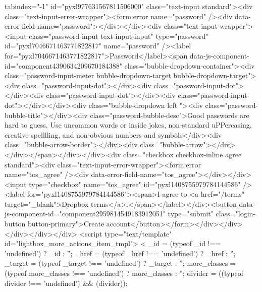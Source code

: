 {tabindex="-1" id="pyxl977631567811506000" class="text-input  standard"><div class="text-input-error-wrapper"><form:error name="password" /><div data-error-field-name="password"></div></div><div class="text-input-wrapper"><input class="password-input text-input-input" type="password" id="pyxl7046671463771822817" name="password" /><label for="pyxl7046671463771822817">Password</label><span data-js-component-id="component4390634209670184388" class="bubble-dropdown-container"><div class="password-input-meter bubble-dropdown-target bubble-dropdown-target"><div class="password-input-dot"></div><div class="password-input-dot"></div><div class="password-input-dot"></div><div class="password-input-dot"></div></div><div class="bubble-dropdown left "><div class="password-bubble-title"></div><div class="password-bubble-desc">Good passwords are hard to guess. Use uncommon words or inside jokes, non-standard uPPercasing, creative spelllling, and non-obvious numbers and symbols</div><div class="bubble-arrow-border"></div><div class="bubble-arrow"></div></div></span></div></div><div class="checkbox checkbox-inline agree standard"><div class="text-input-error-wrapper"><form:error name="tos_agree" /><div data-error-field-name="tos_agree"></div></div><input type="checkbox" name="tos_agree" id="pyxl1408755979784144586" /><label for="pyxl1408755979784144586"><span>I agree to <a href="/terms" target="_blank">Dropbox terms</a>.</span></label></div><button data-js-component-id="component2959814549183912051" type="submit" class="login-button button-primary">Create account</button></form></div></div></div></div></div>
<script type="text/template" id="lightbox_more_actions_item_tmpl">
<%
  _id = (typeof _id !== 'undefined') ? _id : '';
  _href = (typeof _href !== 'undefined') ? _href : '';
  _target = (typeof _target !== 'undefined') ? _target : '';
  more_classes = (typeof more_classes !== 'undefined') ? more_classes : '';
  divider = ((typeof divider !== 'undefined') && (divider));

}
